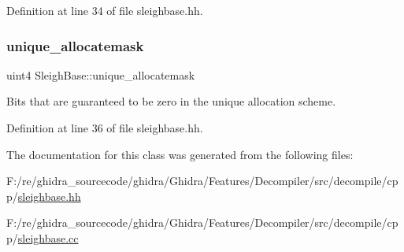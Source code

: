 Definition at line 34 of file sleighbase.\+hh.

\mbox{\label{class_sleigh_base_a846f60e02230c33557328d9e0d7f8914}} 
\subsubsection{\texorpdfstring{unique\_allocatemask}{unique\_allocatemask}}
{\footnotesize\ttfamily uint4 Sleigh\+Base\+::unique\+\_\+allocatemask\hspace{0.3cm}{\ttfamily [protected]}}



Bits that are guaranteed to be zero in the unique allocation scheme. 



Definition at line 36 of file sleighbase.\+hh.



The documentation for this class was generated from the following files\+:\begin{DoxyCompactItemize}
\item 
F\+:/re/ghidra\+\_\+sourcecode/ghidra/\+Ghidra/\+Features/\+Decompiler/src/decompile/cpp/\mbox{\hyperlink{sleighbase_8hh}{sleighbase.\+hh}}\item 
F\+:/re/ghidra\+\_\+sourcecode/ghidra/\+Ghidra/\+Features/\+Decompiler/src/decompile/cpp/\mbox{\hyperlink{sleighbase_8cc}{sleighbase.\+cc}}\end{DoxyCompactItemize}
